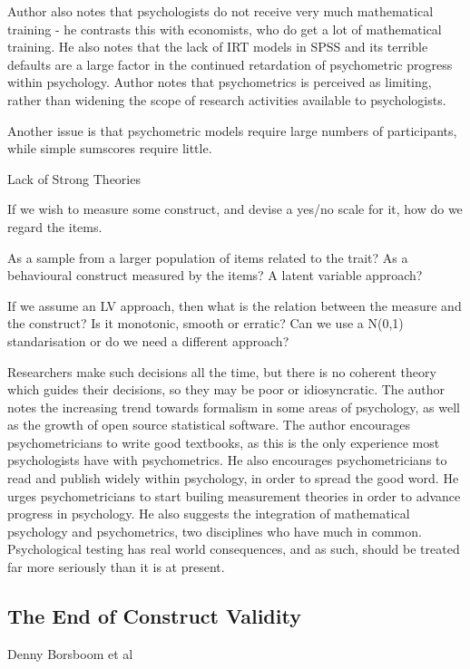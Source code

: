 Author also notes that psychologists do not receive very much mathematical training - he contrasts this with economists, who do get a lot of mathematical training. 
He also notes that the lack of IRT models in SPSS and its terrible defaults are a large factor in the continued retardation of psychometric progress within psychology. 
Author notes that psychometrics is perceived as limiting, rather than widening the scope of research activities available to psychologists.

Another issue is that psychometric models require large numbers of participants, while simple sumscores require little.

Lack of Strong Theories

If we wish to measure some construct, and devise a yes/no scale for it, how do we regard the items.

As a sample from a larger population of items related to the trait?
As a behavioural construct measured by the items?
A latent variable approach?

If we assume an LV approach, then what is the relation between the measure and the construct? Is it monotonic, smooth or erratic? Can we use a N(0,1) standarisation or do we need a different approach?

Researchers make such decisions all the time, but there is no coherent theory which guides their decisions, so they may be poor or idiosyncratic.
The author notes the increasing trend towards formalism in some areas of psychology, as well as the growth of open source statistical software. 
The author encourages psychometricians to write good textbooks, as this is the only experience most psychologists have with psychometrics.
He also encourages psychometricians to read and publish widely within psychology, in order to spread the good word.
He urges psychometricians to start builing measurement theories in order to advance progress in psychology.
He also suggests the integration of mathematical psychology and psychometrics, two disciplines who have much in common. 
Psychological testing has real world consequences, and as such, should be treated far more seriously than it is at present.

\subsection{The End of Construct Validity}
Denny Borsboom et al

